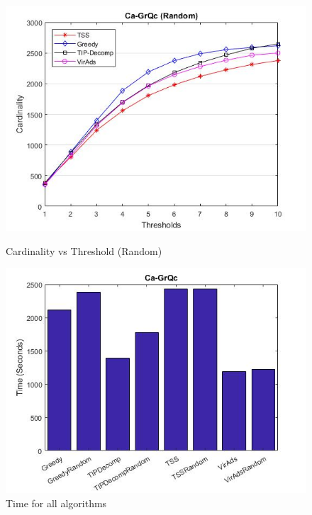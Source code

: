 \begin{figure}[h!]
\begin{minipage}[t]{0.50\textwidth}
\includegraphics[width=\linewidth,keepaspectratio=true]{images/ca-grqcresultrandom.jpg}
\caption{Cardinality vs Threshold (Random)}

\end{minipage}
\begin{minipage}[t]{0.50\textwidth}
\includegraphics[width=\linewidth,keepaspectratio=true]{images/grqctime.jpg}
\caption{Time for all algorithms}
\end{minipage}
\end{figure}


